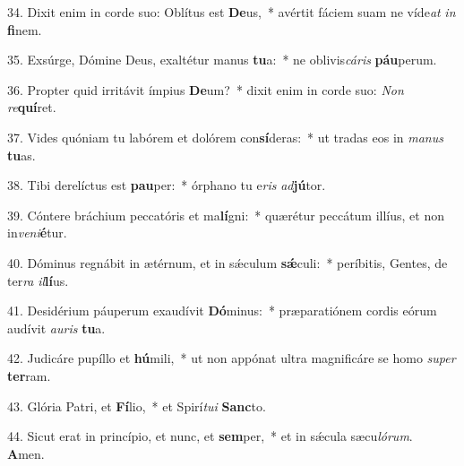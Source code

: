 34. Dixit enim in corde suo: Oblítus est \textbf{De}us,~*  avértit fáciem suam ne víde\textit{at} \textit{in} \textbf{fi}nem.\

35. Exsúrge, Dómine Deus, exaltétur manus \textbf{tu}a:~*  ne oblivis\textit{cá}\textit{ris} \textbf{páu}perum.\

36. Propter quid irritávit ímpius \textbf{De}um?~*  dixit enim in corde suo: \textit{Non} \textit{re}\textbf{quí}ret.\

37. Vides quóniam tu labórem et dolórem con\textbf{sí}deras:~*  ut tradas eos in \textit{ma}\textit{nus} \textbf{tu}as.\

38. Tibi derelíctus est \textbf{pau}per:~*  órphano tu e\textit{ris} \textit{ad}\textbf{jú}tor.\

39. Cóntere bráchium peccatóris et ma\textbf{lí}gni:~*  quærétur peccátum illíus, et non in\textit{ve}\textit{ni}\textbf{é}tur.\

40. Dóminus regnábit in ætérnum, et in sǽculum \textbf{sǽ}culi:~*  períbitis, Gentes, de ter\textit{ra} \textit{il}\textbf{lí}us.\

41. Desidérium páuperum exaudívit \textbf{Dó}minus:~*  præparatiónem cordis eórum audívit \textit{au}\textit{ris} \textbf{tu}a.\

42. Judicáre pupíllo et \textbf{hú}mili,~*  ut non appónat ultra magnificáre se homo \textit{su}\textit{per} \textbf{ter}ram.\

43. Glória Patri, et \textbf{Fí}lio,~*  et Spirí\textit{tu}\textit{i} \textbf{Sanc}to.\

44. Sicut erat in princípio, et nunc, et \textbf{sem}per,~*  et in sǽcula sæcu\textit{ló}\textit{rum}. \textbf{A}men.\

